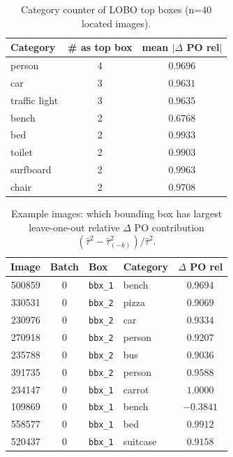 \begin{table}[ht]
\centering
\caption{Category counter of LOBO top boxes (n=40 located images).}
\label{tab:coco-lobo-cat}
\small
\begin{tabular}{@{}l c c@{}}
\toprule
Category & \# as top box & mean $|\Delta$ PO rel$|$ \\
\midrule
person & 4 & $0.9696$ \\
car & 3 & $0.9631$ \\
traffic light & 3 & $0.9635$ \\
bench & 2 & $0.6768$ \\
bed & 2 & $0.9933$ \\
toilet & 2 & $0.9903$ \\
surfboard & 2 & $0.9963$ \\
chair & 2 & $0.9708$ \\
\bottomrule
\end{tabular}
\end{table}

\begin{table}[ht]
\centering
\caption{Example images: which bounding box has largest leave-one-out relative $\Delta$ PO contribution $(\widehat\tau^2-\widehat\tau_{(-k)}^2)/\widehat\tau^2$.}
\label{tab:coco-lobo-examples}
\small
\begin{tabular}{@{}r c l l c@{}}
\toprule
Image & Batch & Box & Category & $\Delta$ PO rel \\
\midrule
500859 & 0 & \texttt{bbx\_1} & bench & $0.9694$ \\
330531 & 0 & \texttt{bbx\_2} & pizza & $0.9069$ \\
230976 & 0 & \texttt{bbx\_2} & car & $0.9334$ \\
270918 & 0 & \texttt{bbx\_2} & person & $0.9207$ \\
235788 & 0 & \texttt{bbx\_2} & bus & $0.9036$ \\
391735 & 0 & \texttt{bbx\_2} & person & $0.9588$ \\
234147 & 0 & \texttt{bbx\_1} & carrot & $1.0000$ \\
109869 & 0 & \texttt{bbx\_1} & bench & $-0.3841$ \\
558577 & 0 & \texttt{bbx\_1} & bed & $0.9912$ \\
520437 & 0 & \texttt{bbx\_1} & suitcase & $0.9158$ \\
\bottomrule
\end{tabular}
\end{table}

